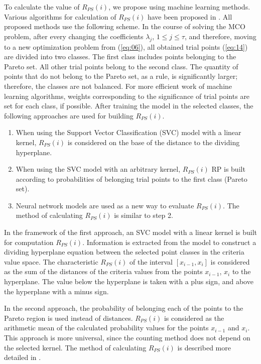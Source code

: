 \documentclass[runningheads]{llncs}
\begin{document}
To calculate the value of $R_{PS}(i)$, we propose using machine learning methods. Various algorithms for calculation of  $R_{PS}(i)$ have been proposed in \cite{Konnov2025}. All proposed methods use the following scheme. In the course of solving the MCO problem, after every changing the coefficients  $\lambda_j$, $1 \leq j \leq \tau$, and therefore, moving to a new optimization problem from (\ref{eq:06}), all obtained trial points (\ref{eq:14}) are divided into two classes. The first class includes points belonging to the Pareto set. All other trial points belong to the second class. The quantity of points that do not belong to the Pareto set, as a rule, is significantly larger; therefore, the classes are not balanced. For more efficient work of machine learning algorithms, weights corresponding to the significance of trial points are set for each class, if possible. After training the model in the selected classes, the following approaches are used for building $R_{PS}(i)$.
\begin{enumerate}
	\item When using the Support Vector Classification (SVC) model with a linear kernel, $R_{PS}(i)$ is considered on the base of the distance to the dividing hyperplane.
	\item	When using the SVC model with an arbitrary kernel, $R_{PS}(i)$ RP is built according to probabilities of belonging trial points to the first class (Pareto set).
	\item Neural network models are used as a new way to evaluate $R_{PS}(i)$. The method of calculating $R_{PS}(i)$ is similar to step 2.
\end{enumerate}

In the framework of the first approach, an SVC model with a linear kernel is built for computation $R_{PS}(i)$. Information is extracted from the model to construct a dividing hyperplane equation between the selected point classes in the criteria value space. The characteristic $R_{PS}(i)$ of the interval $[x_{i-1},x_i ]$ is considered as the sum of the distances of the criteria values  from the points $x_{i-1}$, $x_i$ to the hyperplane. The value below the hyperplane is taken with a plus sign, and above the hyperplane  with a minus sign.

In the second approach, the probability of belonging  each of the points to the Pareto region is used instead of distances. $R_{PS}(i)$ is considered as the arithmetic mean of the calculated probability values for the points $x_{i-1}$ and $x_i$. This approach is more universal, since the counting method does not depend on the selected kernel. The method of calculating $R_{PS}(i)$ is described more detailed in \cite{Konnov2025}.
\end{document}
